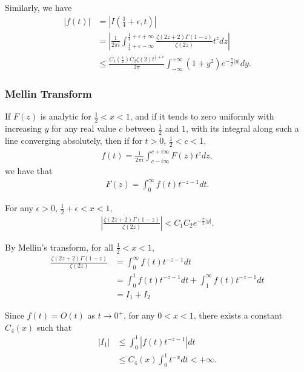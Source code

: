 \documentclass{beamer}
\begin{document}
\frame
{
Similarly, we have 
\begin{align*}
|f(t)| &=  \left|I(\frac{1}{4} + \epsilon, t) \right|\\
            &= \left|\frac{1}{2\pi i} \int^{\frac{1}{4} + \epsilon + \infty}_{\frac{1}{4} + \epsilon -\infty} 
            \frac{\zeta(2z +2)\Gamma(1-z)}{\zeta(2z)}t^{z} dz \right| \\
            &\leq \frac{C_1(\frac{\epsilon}{2})C_2  \zeta(2) t^{\frac{1}{4} + \epsilon} }{2\pi} \int^{+\infty}_{-\infty} (1+y^{2})e^{-\frac{\pi}{2} |y|} dy.
\end{align*}

}

\frame
{
\frametitle{Mellin Transform}
 
If $F(z)$ is analytic for $\frac{1}{2} < x < 1$, and if it tends to zero uniformly with increasing $y$  for 
any real value $c$ between $\frac{1}{2}$ and $1$, with its integral along such a line converging absolutely,
then if for $t > 0$, $\frac{1}{2} < c < 1$,
\begin{align*}
f(t) = \frac{1}{2\pi i} \int^{c + i \infty}_{c - i\infty} F(z)t^{z} dz, 
\end{align*}
we have that 
\begin{align*}
F(z) = \int^{\infty}_{0} f(t)t^{-z-1} dt.
\end{align*}
}

\frame
{For any $\epsilon > 0$, $\frac{1}{2}  + \epsilon < x < 1$, 
\begin{align*}
\left|\frac{\zeta(2z + 2)\Gamma(1-z)}{\zeta(2z)}\right| < C_1 C_2 e^{-\frac{\pi}{2}|y|}.
\end{align*}

By Mellin's transform, for all $\frac{1}{2} < x < 1$,
\begin{align*}
\frac{\zeta(2z + 2)\Gamma(1-z)}{\zeta(2z)} &= \int^{\infty}_{0} f(t) t^{-z -1} dt \\
                                                                                       &= \int^{1}_{0} f(t) t^{-z -1} dt + \int^{\infty}_{1} f(t) t^{-z -1} dt\\
                                                                                       &= I_1 + I_2
\end{align*}

}

\frame
{
Since $f(t) = O(t)$ as $t \rightarrow 0^+$,  for any $0 < x < 1 $,  there exists a constant $C_4(x)$ such that
\begin{align*}
|I_1| &\leq \int^{1}_{0} |f(t) t^{-z -1}| dt \\
            &\leq  C_4(x)\int^{1}_{0} t^{-x} dt  < + \infty.
\end{align*} 
}
\end{document}

